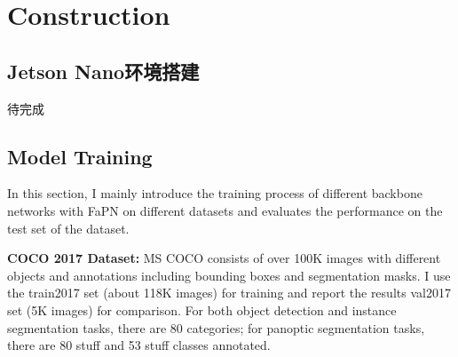 
\section{Construction}




\subsection{Jetson Nano环境搭建}
待完成

\subsection{Model Training}


In this section, I mainly introduce the training process of different backbone networks with FaPN on different datasets and evaluates the performance on the test set of the dataset.

\textbf{COCO 2017 Dataset: }MS COCO \cite{lin2014microsoft} consists of over 100K images with different objects and annotations including bounding boxes and segmentation masks. I use the train2017 set (about 118K images) for training and report the results val2017 set (5K images) for comparison. For both object detection and instance segmentation tasks, there are 80 categories; for panoptic segmentation tasks, there are 80 stuff and 53 stuff classes annotated.


